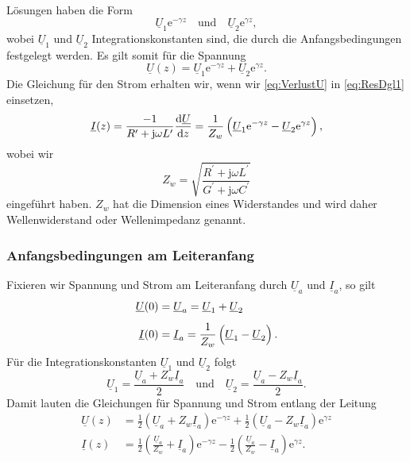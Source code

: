\documentclass[paper=a4, parskip=half-, ngerman, fontsize=11pt]{scrreprt}
\begin{document}
Lösungen haben die Form
\[ \underline{U}_{1} \mathrm{e}^{- \gamma z} \quad \text{und} \quad \underline{U}_{2} \mathrm{e}^{\gamma z}, \]
wobei $\underline{U}_{1}$ und $\underline{U}_{2}$ Integrationskonstanten sind, die durch die Anfangsbedingungen
festgelegt werden. Es gilt somit für die Spannung
\begin{equation}
    \underline{U}(z) = \underline{U}_{1} \mathrm{e}^{- \gamma z}
     +
     \underline{U}_{2} \mathrm{e}^{\gamma z} \label{eq:VerlustU}.
\end{equation}
Die Gleichung für den Strom erhalten wir, wenn wir \eqref{eq:VerlustU} in \eqref{eq:ResDgl1} einsetzen,
\begin{equation}
    \underline{I}(z) = \frac{-1}{R^{\prime} + \mathrm{j} \omega L^{\prime}} \frac{\text{d} \underline{U}}{\text{d} z}
    = \frac{1}{Z_{w}}
    \left(
    \vphantom{\sqrt{1}{Z}}
    \underline{U}_{1} \mathrm{e}^{- \gamma z} - \underline{U}_{2} \mathrm{e}^{\gamma z} \right), \label{eq:VerlustI}
\end{equation}
wobei wir
\begin{equation}
    Z_{w} = \sqrt{\frac{R^{\prime} + \mathrm{j} \omega L^{\prime}}{G^{\prime} + \mathrm{j} \omega C^{\prime}}}
    \label{eq:Zw}
\end{equation}
eingeführt haben. $Z_{w}$ hat die Dimension eines Widerstandes und wird daher Wellenwiderstand oder Wellenimpedanz
genannt.

\subsubsection{Anfangsbedingungen am Leiteranfang}

Fixieren wir Spannung und Strom am Leiteranfang durch $\underline{U}_{a}$ und $\underline{I}_{a}$, so gilt
\begin{align*}
    \underline{U}(0) &= \underline{U}_{a} = \underline{U}_{1} + \underline{U}_{2} \\[1ex]
    \underline{I}(0) &= \underline{I}_{a} = \frac{1}{Z_{w}}
    \left(
    \vphantom{\sqrt{1}{Z_{w}}}
    \underline{U}_{1} - \underline{U}_{2} \right).
\end{align*}
Für die Integrationskonstanten $\underline{U}_{1}$ und $\underline{U}_{2}$ folgt
\[ \underline{U}_{1} = \frac{\underline{U}_{a} + Z_{w} \underline{I}_{a}}{2} \quad \text{und} \quad \underline{U}_{2} =
\frac{\underline{U}_{a} - Z_{w} \underline{I}_{a}}{2}. \]
Damit lauten die Gleichungen für Spannung und Strom entlang der Leitung
\begin{align}
    \underline{U}(z) &=
    \frac{1}{2} \left( \underline{U}_{a} + Z_{w} \underline{I}_{a} \right) \mathrm{e}^{- \gamma z}
    +
    \frac{1}{2} \left( \underline{U}_{a} - Z_{w} \underline{I}_{a} \right) \mathrm{e}^{\gamma z} \label{eq:UxA} \\[1ex]
    \underline{I}(z) &=
    \frac{1}{2} \left( \frac{\underline{U}_{a}}{Z_{w}} + \underline{I}_{a} \right) \mathrm{e}^{- \gamma z}
    -
    \frac{1}{2} \left( \frac{\underline{U}_{a}}{Z_{w}} - \underline{I}_{a} \right) \mathrm{e}^{\gamma z} \label{eq:IxA}
    .
\end{align}
\end{document}
